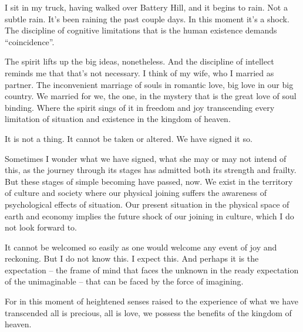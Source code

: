 

I sit in my truck, having walked over Battery Hill, and it begins to
rain.  Not a subtle rain.  It's been raining the past couple days.  In
this moment it's a shock.  The discipline of cognitive limitations
that is the human existence demands ``coincidence''.  

The spirit lifts up the big ideas, nonetheless.  And the discipline of
intellect reminds me that that's not necessary.  I think of my wife,
who I married as partner.  The inconvenient marriage of souls in
romantic love, big love in our big country.  We married for we, the
one, in the mystery that is the great love of soul binding.  Where the
spirit sings of it in freedom and joy transcending every limitation of
situation and existence in the kingdom of heaven.

It is not a thing.  It cannot be taken or altered.  We have signed it
so.  

Sometimes I wonder what we have signed, what she may or may not intend
of this, as the journey through its stages has admitted both its
strength and frailty.  But these stages of simple becoming have
passed, now.  We exist in the territory of culture and society where
our physical joining suffers the awareness of psychological effects of
situation.  Our present situation in the physical space of earth and
economy implies the future shock of our joining in culture, which I do
not look forward to.

It cannot be welcomed so easily as one would welcome any event of joy
and reckoning.  But I do not know this.  I expect this.  And perhaps
it is the expectation -- the frame of mind that faces the unknown in
the ready expectation of the unimaginable -- that can be faced by the
force of imagining.

For in this moment of heightened senses raised to the experience of
what we have transcended all is precious, all is love, we possess the
benefits of the kingdom of heaven.

\bye

